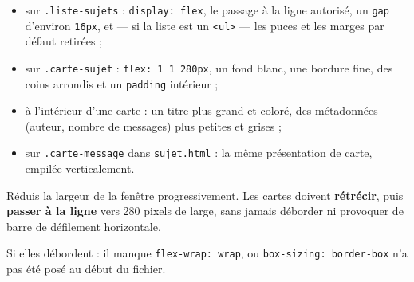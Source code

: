 \documentclass[a4paper,11pt]{article}
\begin{document}
\begin{center}
\end{center}

\begin{tcolorbox}[definition, title={À produire dans la section 4 de \texttt{style.css}}]
\begin{itemize}
  \item sur \texttt{.liste-sujets} : \texttt{display: flex}, le passage à la ligne autorisé, un \texttt{gap} d'environ \texttt{16px}, et --- si la liste est un \texttt{<ul>} --- les puces et les marges par défaut retirées ;
  \item sur \texttt{.carte-sujet} : \texttt{flex: 1 1 280px}, un fond blanc, une bordure fine, des coins arrondis et un \texttt{padding} intérieur ;
  \item à l'intérieur d'une carte : un titre plus grand et coloré, des métadonnées (auteur, nombre de messages) plus petites et grises ;
  \item sur \texttt{.carte-message} dans \texttt{sujet.html} : la même présentation de carte, empilée verticalement.
\end{itemize}
\end{tcolorbox}

\begin{tcolorbox}[attention, title={Le test à faire immédiatement}]
Réduis la largeur de la fenêtre progressivement. Les cartes doivent \textbf{rétrécir}, puis \textbf{passer à la ligne} vers 280 pixels de large, sans jamais déborder ni provoquer de barre de défilement horizontale.

\vspace{3pt}
Si elles débordent : il manque \texttt{flex-wrap: wrap}, ou \texttt{box-sizing: border-box} n'a pas été posé au début du fichier.
\end{tcolorbox}
\end{document}

